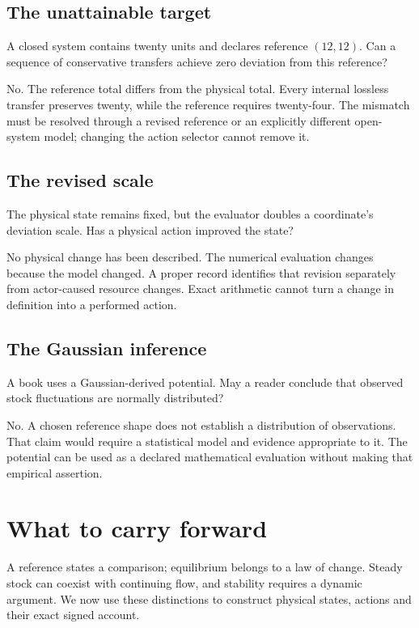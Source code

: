 \subsection{The unattainable target}
A closed system contains twenty units and declares reference $(12,12)$. Can a sequence of conservative transfers achieve zero deviation from this reference?

No. The reference total differs from the physical total. Every internal lossless transfer preserves twenty, while the reference requires twenty-four. The mismatch must be resolved through a revised reference or an explicitly different open-system model; changing the action selector cannot remove it.

\subsection{The revised scale}
The physical state remains fixed, but the evaluator doubles a coordinate's deviation scale. Has a physical action improved the state?

No physical change has been described. The numerical evaluation changes because the model changed. A proper record identifies that revision separately from actor-caused resource changes. Exact arithmetic cannot turn a change in definition into a performed action.

\subsection{The Gaussian inference}
A book uses a Gaussian-derived potential. May a reader conclude that observed stock fluctuations are normally distributed?

No. A chosen reference shape does not establish a distribution of observations. That claim would require a statistical model and evidence appropriate to it. The potential can be used as a declared mathematical evaluation without making that empirical assertion.

\section{What to carry forward}
A reference states a comparison; equilibrium belongs to a law of change. Steady stock can coexist with continuing flow, and stability requires a dynamic argument. We now use these distinctions to construct physical states, actions and their exact signed account.
